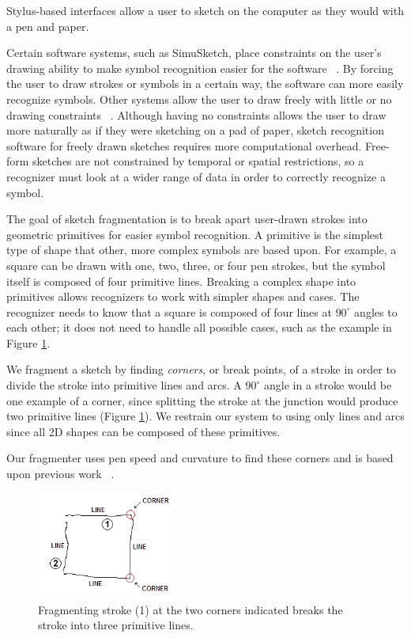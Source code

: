 \documentclass[10pt]{acmsiggraph}          %
\begin{document}

Stylus-based interfaces allow a user to sketch on the computer as they would with a pen and paper.

Certain software systems, such as SimuSketch, place constraints on the user's drawing ability to make symbol recognition easier for the software ~\cite{Kara04}. By forcing the
user to draw strokes or symbols in a certain way, the software can more easily recognize symbols. Other systems allow the user to draw freely with little or no drawing constraints ~\cite{Alvarado04}. Although having no constraints allows the user to draw more naturally as if they were sketching on a pad of paper, sketch recognition software for freely drawn sketches requires more computational overhead. Free-form sketches are not constrained by temporal or spatial restrictions, so a recognizer must look at a wider range of data in order to correctly recognize a symbol.

The goal of sketch fragmentation is to break apart user-drawn strokes into geometric primitives for easier symbol recognition. A primitive is the simplest type of
shape that other, more complex symbols are based upon. For example, a square can be drawn with one, two, three, or four pen strokes, but the symbol itself is composed of four primitive lines. Breaking a complex shape into primitives allows recognizers to work with simpler shapes and cases. The recognizer needs to know that a square is composed of four lines at $90^\circ$ angles to each other; it does not need to handle all possible cases, such as the example in Figure \ref{fig:primitive_corners}.

We fragment a sketch by finding \textit{corners}, or break points, of a stroke in order to divide the stroke into primitive lines and arcs. A $90^\circ$ angle in a stroke
would be one example of a corner, since splitting the stroke at the junction would produce two primitive lines (Figure \ref{fig:primitive_corners}). We restrain our system to
using only lines and arcs since all 2D shapes can be composed of these primitives. 

Our fragmenter uses pen speed and curvature to find these corners and is based upon previous work ~\cite{Sezgin01,Stahovich04}.

\begin{figure}[t]
  \centering
  \includegraphics[width=1.8in]{primitive_corners.png}
  \caption{Fragmenting stroke (1) at the two corners indicated breaks the stroke into three primitive lines.}
  \label{fig:primitive_corners}
\end{figure}
\end{document}
